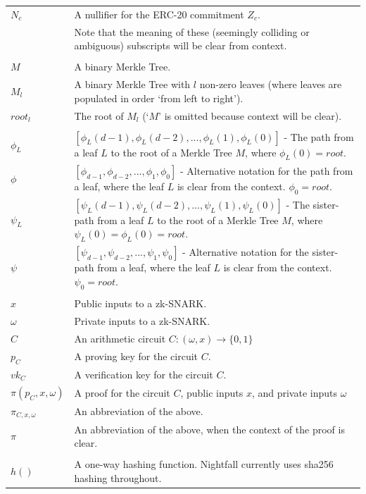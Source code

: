 \documentclass{article}
\begin{document}
\begin{center}
\begin{tabular}{lp{14cm}}
    $N_c$         & A nullifier for the ERC-20 commitment $Z_c$.\\
                  & Note that the meaning of these (seemingly colliding or ambiguous) subscripts will be clear from context.\\
    \\
		$M$           & A binary Merkle Tree.\\
    $M_l$         & A binary Merkle Tree with $l$ non-zero leaves (where leaves are populated in order `from left to right').\\
    $root_l$      & The root of $M_l$ (`$M$' is omitted because context will be clear).\\
    \\
    $\phi_{L}$    & $[\phi_{L}(d-1), \phi_{L}(d-2),..., \phi_{L}(1), \phi_{L}(0)]$ - The path from a leaf $L$ to the root of a Merkle Tree $M$, where $\phi_L(0) = root$.\\
    $\phi$        & $[\phi_{d-1}, \phi_{d-2},..., \phi_{1}, \phi_0]$ - Alternative notation for the path from a leaf, where the leaf $L$ is clear from the context. $\phi_0 = root$.\\
    $\psi_{L}$    & $[\psi_{L}(d-1), \psi_{L}(d-2),..., \psi_{L}(1), \psi_{L}(0)]$ - The sister-path from a leaf $L$ to the root of a Merkle Tree $M$, where $\psi_L(0) = \phi_L(0) = root$.\\
    $\psi$        &  $[\psi_{d-1}, \psi_{d-2},..., \psi_{1}, \psi_0]$ - Alternative notation for the sister-path from a leaf, where the leaf $L$ is clear from the context. $\psi_0 = root$.\\
    \\
		$x$           & Public inputs to a zk-SNARK. \\
		$\omega$      & Private inputs to a zk-SNARK.\\
		$C$           & An arithmetic circuit $C: (\omega, x) \to \{0,1\}$\\
		$p_C$         & A proving key for the circuit $C$. \\
		$vk_C$        & A verification key for the circuit $C$. \\
    $\pi(p_C, x, \omega)$ & A proof for the circuit $C$, public inputs $x$, and private inputs $\omega$ \\
    $\pi_{C, x, \omega}$ & An abbreviation of the above. \\
    $\pi$         & An abbreviation of the above, when the context of the proof is clear.\\
    \\
    $h()$         & A one-way hashing function. Nightfall currently uses sha256 hashing throughout.\\
  \end{tabular}
\end{center}
\end{document}
